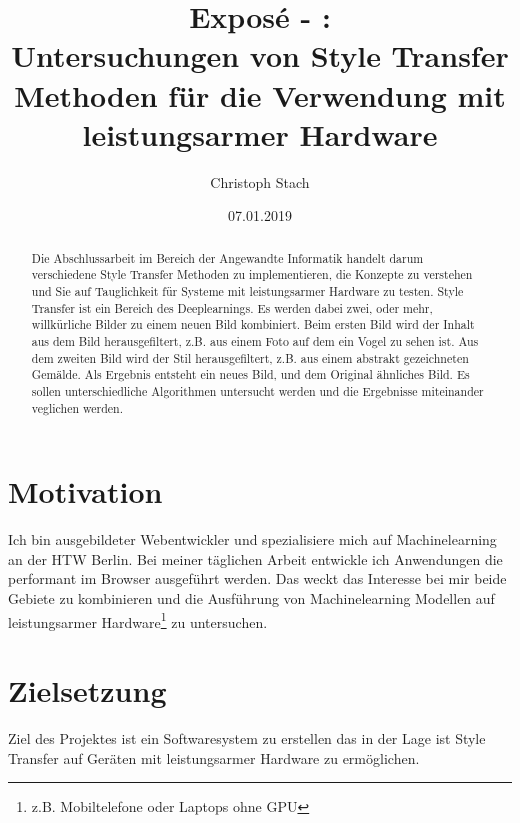 


\title{\bf Exposé - \@exposeType:\protect\\ Untersuchungen von Style Transfer Methoden für die Verwendung mit leistungsarmer Hardware}
\author{Christoph Stach}
\date{07.01.2019}



\maketitle

\begin{otherlanguage}{ngerman}
	\begin{abstract}
		Die Abschlussarbeit im Bereich der Angewandte Informatik handelt darum verschiedene Style Transfer Methoden zu implementieren,
		die Konzepte zu verstehen und Sie auf Tauglichkeit für Systeme mit leistungsarmer Hardware zu testen. Style Transfer ist ein Bereich des 
		Deeplearnings. Es werden dabei zwei, oder mehr, willkürliche Bilder zu einem neuen Bild kombiniert. Beim ersten Bild wird der Inhalt aus
		dem Bild herausgefiltert, z.B. aus einem Foto auf dem ein Vogel zu sehen ist. Aus dem zweiten Bild wird der Stil herausgefiltert, 
		z.B. aus einem abstrakt gezeichneten Gemälde. Als Ergebnis entsteht ein neues Bild, und dem Original ähnliches Bild. Es sollen 
		unterschiedliche Algorithmen untersucht werden und die Ergebnisse miteinander veglichen werden.
	\end{abstract}
\end{otherlanguage}

\pagebreak

\section{Motivation}
Ich bin ausgebildeter Webentwickler und spezialisiere mich auf Machinelearning an der HTW Berlin. Bei meiner täglichen Arbeit
entwickle ich Anwendungen die performant im Browser ausgeführt werden. Das weckt das Interesse bei mir beide Gebiete zu kombinieren
und die Ausführung von Machinelearning Modellen auf leistungsarmer Hardware\footnote{z.B. Mobiltelefone oder Laptops ohne GPU} zu untersuchen.

\section{Zielsetzung}
Ziel des Projektes ist ein Softwaresystem zu erstellen das in der Lage ist
Style Transfer auf Geräten mit leistungsarmer Hardware zu ermöglichen.

